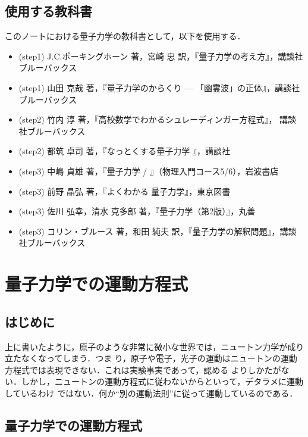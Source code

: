         \subsection{使用する教科書}
            このノートにおける量子力学の教科書として，以下を使用する．
                \begin{itemize}
                    \item (step1) J.C.ポーキングホーン 著，宮崎 忠 訳，『量子力学の考え方』，講談社ブルーバックス
                    \item (step1) 山田 克哉 著，『量子力学のからくり --- 「幽霊波」の正体』，講談社ブルーバックス
                    \item (step2) 竹内 淳 著，『高校数学でわかるシュレーディンガー方程式』， 講談社ブルーバックス
                    \item (step2) 都筑 卓司 著，『なっとくする量子力学 』，講談社
                    \item (step3) 中嶋 貞雄 著，『量子力学 \I / \II 』（物理入門コース5/6），岩波書店
                    \item (step3) 前野 晶弘 著，『よくわかる 量子力学』，東京図書
                    \item (step3) 佐川 弘幸，清水 克多郎 著，『量子力学（第2版）』，丸善
                    \item (step3) コリン・ブルース 著，和田 純夫 訳，『量子力学の解釈問題』，講談社ブルーバックス
                \end{itemize}

    \section{量子力学での運動方程式}
        \subsection{はじめに}
            上に書いたように，原子のような非常に微小な世界では，ニュートン力学が成り立たなくなってしまう．つま
            り，原子や電子，光子の運動はニュートンの運動方程式では表現できない．これは実験事実であって，認める
            よりしかたがない．しかし，ニュートンの運動方程式に従わないからといって，デタラメに運動しているわけ
            ではない．何か“別の運動法則”に従って運動しているのである．

        \subsection{量子力学での運動方程式}
